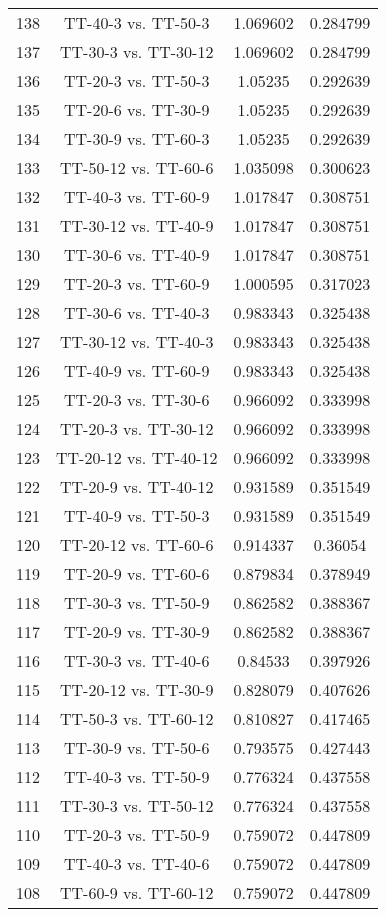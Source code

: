 \documentclass[a4paper,10pt]{article}
\begin{document}
\begin{landscape}
\begin{table}[!htp]
\begin{tabular}{cccc}
138&TT-40-3 vs. TT-50-3&1.069602&0.284799\\
137&TT-30-3 vs. TT-30-12&1.069602&0.284799\\
136&TT-20-3 vs. TT-50-3&1.05235&0.292639\\
135&TT-20-6 vs. TT-30-9&1.05235&0.292639\\
134&TT-30-9 vs. TT-60-3&1.05235&0.292639\\
133&TT-50-12 vs. TT-60-6&1.035098&0.300623\\
132&TT-40-3 vs. TT-60-9&1.017847&0.308751\\
131&TT-30-12 vs. TT-40-9&1.017847&0.308751\\
130&TT-30-6 vs. TT-40-9&1.017847&0.308751\\
129&TT-20-3 vs. TT-60-9&1.000595&0.317023\\
128&TT-30-6 vs. TT-40-3&0.983343&0.325438\\
127&TT-30-12 vs. TT-40-3&0.983343&0.325438\\
126&TT-40-9 vs. TT-60-9&0.983343&0.325438\\
125&TT-20-3 vs. TT-30-6&0.966092&0.333998\\
124&TT-20-3 vs. TT-30-12&0.966092&0.333998\\
123&TT-20-12 vs. TT-40-12&0.966092&0.333998\\
122&TT-20-9 vs. TT-40-12&0.931589&0.351549\\
121&TT-40-9 vs. TT-50-3&0.931589&0.351549\\
120&TT-20-12 vs. TT-60-6&0.914337&0.36054\\
119&TT-20-9 vs. TT-60-6&0.879834&0.378949\\
118&TT-30-3 vs. TT-50-9&0.862582&0.388367\\
117&TT-20-9 vs. TT-30-9&0.862582&0.388367\\
116&TT-30-3 vs. TT-40-6&0.84533&0.397926\\
115&TT-20-12 vs. TT-30-9&0.828079&0.407626\\
114&TT-50-3 vs. TT-60-12&0.810827&0.417465\\
113&TT-30-9 vs. TT-50-6&0.793575&0.427443\\
112&TT-40-3 vs. TT-50-9&0.776324&0.437558\\
111&TT-30-3 vs. TT-50-12&0.776324&0.437558\\
110&TT-20-3 vs. TT-50-9&0.759072&0.447809\\
109&TT-40-3 vs. TT-40-6&0.759072&0.447809\\
108&TT-60-9 vs. TT-60-12&0.759072&0.447809\\

\end{tabular}
\end{table}
\end{landscape}
\end{document}
